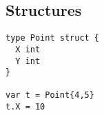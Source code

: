 \subsection{Structures}
\begin{lstlisting}
type Point struct {
  X int
  Y int
}

var t = Point{4,5}
t.X = 10
\end{lstlisting}

